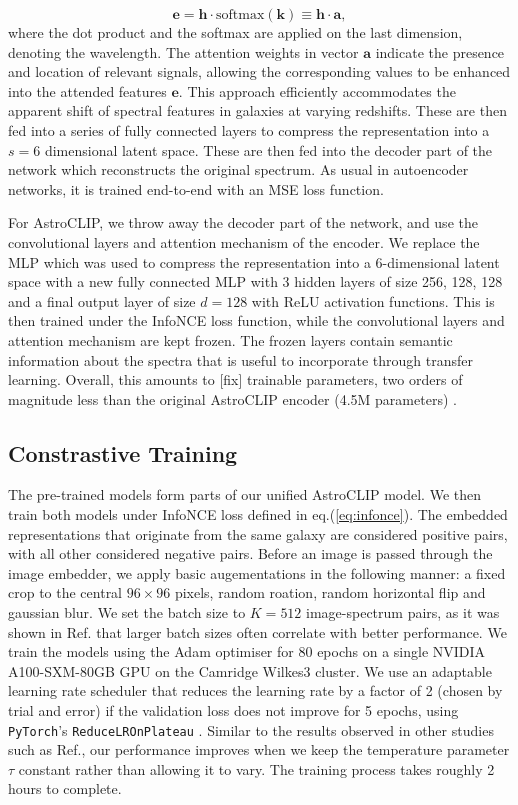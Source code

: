 \documentclass[a4paper,12pt]{article}
\begin{document}
\begin{equation}
    \mathbf{e} = \mathbf{h} \cdot \text{softmax}(\mathbf{k}) \equiv \mathbf{h} \cdot \mathbf{a},
\end{equation}
where the dot product and the softmax are applied on the last dimension, denoting the wavelength. The attention weights in vector $\mathbf{a}$ indicate the presence and location of relevant signals, allowing the corresponding values to be enhanced into the attended features $\mathbf{e}$. This approach efficiently accommodates the apparent shift of spectral features in galaxies at varying redshifts. These are then fed into a series of fully connected layers to compress the representation into a $s=6$ dimensional latent space. These are then fed into the decoder part of the network which reconstructs the original spectrum. As usual in autoencoder networks, it is trained end-to-end with an MSE loss function. 

For AstroCLIP, we throw away the decoder part of the network, and use the convolutional layers and attention mechanism of the encoder. We replace the MLP which was used to compress the representation into a 6-dimensional latent space with a new fully connected MLP with 3 hidden layers of size 256, 128, 128 and a final output layer of size $d=128$ with ReLU activation functions. This is then trained under the InfoNCE loss function, while the convolutional layers and attention mechanism are kept frozen. The frozen layers contain semantic information about the spectra that is useful to incorporate through transfer learning. Overall, this amounts to [fix] trainable parameters, two orders of magnitude less than the original AstroCLIP encoder (4.5M parameters) \cite{astroclip}. 


\subsection{Constrastive Training}
The pre-trained models form parts of our unified AstroCLIP model. We then train both models under InfoNCE loss defined in eq.(\ref{eq:infonce}). The embedded representations that originate from the same galaxy are considered positive pairs, with all other considered negative pairs. Before an image is passed through the image embedder, we apply basic augementations in the following manner: a fixed crop to the central $96 \times 96$ pixels, random roation, random horizontal flip and gaussian blur. We set the batch size to $K=512$ image-spectrum pairs, as it was shown in Ref.\cite{radford2021learning} that larger batch sizes often correlate with better performance. We train the models using the Adam optimiser \cite{adam} for 80 epochs on a single NVIDIA A100-SXM-80GB GPU on the Camridge Wilkes3 cluster. We use an adaptable learning rate scheduler that reduces the learning rate by a factor of 2 (chosen by trial and error) if the validation loss does not improve for 5 epochs, using \verb|PyTorch|'s \verb|ReduceLROnPlateau| \cite{LRon}. Similar to the results observed in other studies such as Ref.\cite{gir},  our performance improves when we keep the temperature parameter $\tau$ constant rather than allowing it to vary. The training process takes roughly 2 hours to complete.
\end{document}
